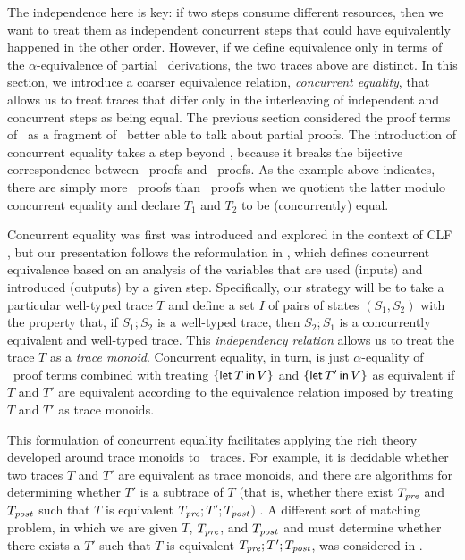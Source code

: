 The independence here is key: if two steps consume different
resources, then we want to treat them as independent concurrent steps
that could have equivalently happened in the other order. However, if
we define equivalence only in terms of the $\alpha$-equivalence of
partial \ollll~derivations, the two traces above are distinct. In this
section, we introduce a coarser equivalence relation, {\it concurrent
  equality}, that allows us to treat traces that differ only in the
interleaving of independent and concurrent steps as being equal.  The
previous section considered the proof terms of \sls~as a fragment of
\ollll~better able to talk about partial proofs.  The introduction of
concurrent equality takes a step beyond \ollll, because it breaks the
bijective correspondence between \ollll~proofs and \sls~proofs. As the
example above indicates, there are simply more \ollll~proofs than
\sls~proofs when we quotient the latter modulo concurrent equality and
declare $T_1$ and $T_2$ to be (concurrently) equal.

Concurrent equality was first was introduced and explored in the
context of CLF \cite{watkins02concurrent}, but our presentation
follows the reformulation in \cite{cervesato12trace}, which defines
concurrent equivalence based on an analysis of the variables that are
used (inputs) and introduced (outputs) by a given step.  Specifically,
our strategy will be to take a particular well-typed trace $T$ and
define a set $I$ of pairs of states $(S_1, S_2)$ with the property
that, if $S_1; S_2$ is a well-typed trace, then $S_2; S_1$ is a
concurrently equivalent and well-typed trace.  This {\it independency
  relation} allows us to treat the trace $T$ as a {\it trace
  monoid}. Concurrent equality, in turn, is just $\alpha$-equality of
\sls~proof terms combined with treating $\{{\sf let}\,{T}\,{\sf in}\, {V} \}$ and
$\{{\sf let}\,{T'}\,{\sf in}\, {V} \}$ as equivalent if $T$ and $T'$ are equivalent
according to the equivalence relation imposed by treating $T$ and $T'$
as trace monoids.

This formulation of concurrent equality facilitates applying the rich
theory developed around trace monoids to \sls~traces.  For example, it
is decidable whether two traces $T$ and $T'$ are equivalent as trace
monoids, and there are algorithms for determining whether $T'$ is a
subtrace of $T$ (that is, whether there exist $T_{\it pre}$ and
$T_{\it post}$ such that $T$ is equivalent $T_{\it pre}; T'; T_{\it
  post}$) \cite{diekert90combinatorics}. A different sort of matching
problem, in which we are given $T$, $T_{\it pre}$, and $T_{\it post}$
and must determine whether there exists a $T'$ such that $T$ is
equivalent $T_{\it pre}; T'; T_{\it post}$, was considered in
\cite{cervesato12trace}.

